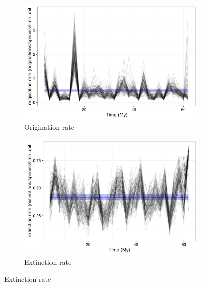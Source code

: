 \documentclass[12pt,letterpaper]{article}
\begin{document}
\begin{figure}[ht]
  \begin{subfigure}[b]{0.45\textwidth}
    \includegraphics[width=\textwidth,height=0.5\textheight,keepaspectratio=true]{figure/orig_rate}
    \caption{Origination rate}
    \label{fig:origin_rate}
  \end{subfigure}
  \begin{subfigure}[b]{0.45\textwidth}
    \includegraphics[width=\textwidth,height=0.5\textheight,keepaspectratio=true]{figure/death_rate}
    \caption{Extinction rate}
    \label{fig:extinct_rate}
  \end{subfigure}

\end{figure}
\end{document}
